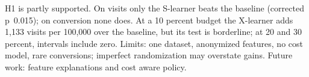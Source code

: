 H1 is partly supported. On visits only the \mbox{S-learner} beats the baseline (corrected p~0.015); on conversion none does. At a 10 percent budget the \mbox{X-learner} adds 1,133 visits per 100,000 over the baseline, but its test is borderline; at 20 and 30 percent, intervals include zero. Limits: one dataset, anonymized features, no cost model, rare conversions; imperfect randomization may overstate gains. Future work: feature explanations and cost aware policy.
